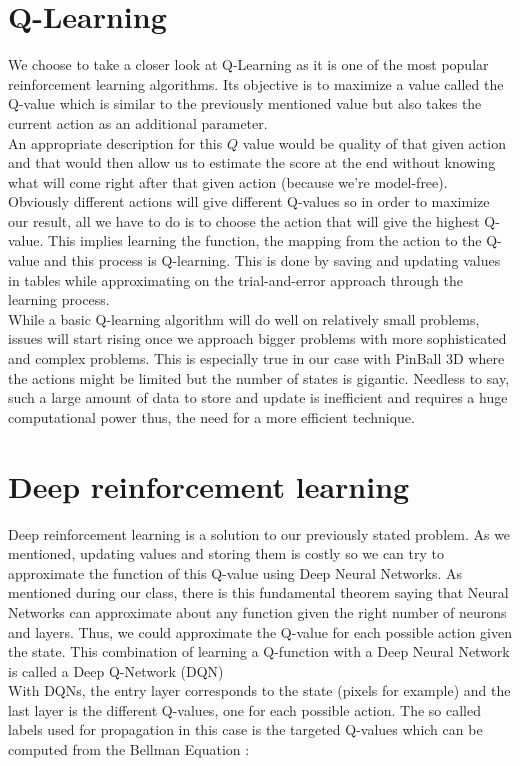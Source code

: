 \documentclass[a4paper,12pt,calibri,oneside,openany]{book}
\theoremstyle{break}
\begin{document}
\section{Q-Learning}
\qquad We choose to take a closer look at Q-Learning as it is one of the most popular reinforcement learning algorithms. Its objective is to maximize a value called the Q-value which is similar to the previously mentioned value but also takes the current action as an additional parameter.\\

An appropriate description for this $Q$ value would be quality of that given action and that would then allow us to estimate the score at the end without knowing what will come right after that given action (because we're model-free).\\

Obviously different actions will give different Q-values so in order to maximize our result, all we have to do is to choose the action that will give the highest Q-value. This implies learning the function, the mapping from the action to the Q-value and this process is Q-learning. This is done by saving and updating values in tables while approximating on the trial-and-error approach through the learning process.\\

While a basic Q-learning algorithm will do well on relatively small problems, issues will start rising once we approach bigger problems with more sophisticated and complex problems. This is especially true in our case with PinBall 3D where the actions might be limited but the number of states is gigantic. Needless to say, such a large amount of data to store and update is inefficient and requires a huge computational power thus, the need for a more efficient technique.
\section{Deep reinforcement learning}
\qquad Deep reinforcement learning is a solution to our previously stated problem. As we mentioned, updating values and storing them is costly so we can try to approximate the function of this Q-value using Deep Neural Networks. As mentioned during our class, there is this fundamental theorem saying that Neural Networks can approximate about any function given the right number of neurons and layers. Thus, we could approximate the Q-value for each possible action given the state. This combination of learning a Q-function with a Deep Neural Network is called a Deep Q-Network (DQN)\\
\clearpage
With DQNs, the entry layer corresponds to the state (pixels for example) and the last layer is the different Q-values, one for each possible action. The so called labels used for propagation in this case is the targeted Q-values which can be computed from the Bellman Equation :
\end{document}
